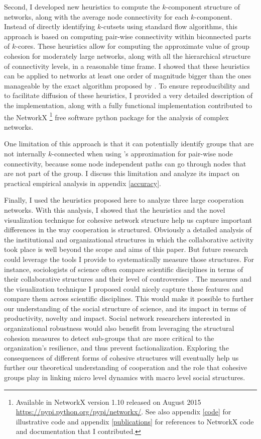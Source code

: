Second, I developed new heuristics to compute the $k$-component structure of networks, along with the average node connectivity for each $k$-component. Instead of directly identifying $k$-cutsets using standard flow algorithms, this approach is based on computing pair-wise connectivity within biconnected parts of $k$-cores. These heuristics allow for computing the approximate value of group cohesion for moderately large networks, along with all the hierarchical structure of connectivity levels, in a reasonable time frame. I showed that these heuristics can be applied to networks at least one order of magnitude bigger than the ones manageable by the exact algorithm proposed by \citet{moody:2003}. To ensure reproducibility and to facilitate diffusion of these heuristics, I provided a very detailed description of the implementation, along with a fully functional implementation contributed to the NetworkX \footnote{Available in NetworkX version 1.10 released on August 2015 \href{https://pypi.python.org/pypi/networkx/}{https://pypi.python.org/pypi/networkx/}. See also appendix \ref{code} for illustrative code and appendix \ref{publications} for references to NetworkX code and documentation that I contributed.} free software python package for the analysis of complex networks.

One limitation of this approach is that it can potentially identify groups that are not internally $k$-connected when using \citet{white:2001b}'s approximation for pair-wise node connectivity, because some node independent paths can go through nodes that are not part of the group. I discuss this limitation and analyze its impact on practical empirical analysis in appendix \ref{accuracy}.

Finally, I used the heuristics proposed here to analyze three large cooperation networks. With this analysis, I showed that the heuristics and the novel visualization technique for cohesive network structure help us capture important differences in the way cooperation is structured. Obviously a detailed analysis of the institutional and organizational structures in which the collaborative activity took place is well beyond the scope and aims of this paper. But future research could leverage the tools I provide to systematically measure those structures. For instance, sociologists of science often compare scientific disciplines in terms of their collaborative structures \citep{moody:2004} and their level of controversies \citep{bearman:2010}. The measures and the visualization technique I proposed could nicely capture these features and compare them across scientific disciplines. This would make it possible to further our understanding of the social structure of science, and its impact in terms of productivity, novelty and impact. Social network researchers interested in organizational robustness would also benefit from leveraging the structural cohesion measures to detect sub-groups that are more critical to the organization's resilience, and thus prevent factionalization. Exploring the consequences of different forms of cohesive structures will eventually help us further our theoretical understanding of cooperation and the role that cohesive groups play in linking micro level dynamics with macro level social structures.
